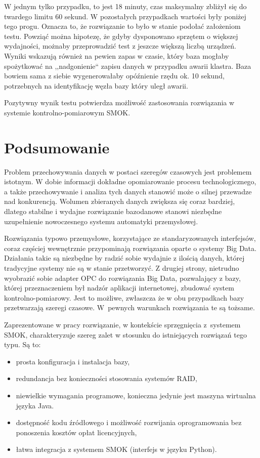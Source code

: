 \documentclass[a4paper,polish,12pt,twoside]{article}
\def \docsection#1{\clearpage\section{#1}}
\begin{document}
W jednym tylko przypadku, to jest 18 minuty, czas maksymalny zbliżył się do twardego limitu 60 sekund. W pozostałych przypadkach wartości były poniżej tego progu. Oznacza to, że rozwiązanie to było w stanie podołać założeniom testu. Powziąć można hipotezę, że gdyby dysponowano sprzętem o większej wydajności, możnaby przeprowadzić test z jeszcze większą liczbą urządzeń. Wyniki wskazują również na pewien zapas w czasie, który baza mogłaby spożytkować na ,,nadgonienie`` zapisu danych w przypadku awarii klastra. Baza bowiem sama z siebie wygenerowałaby opóźnienie rzędu ok. 10 sekund, potrzebnych na identyfikację węzła bazy który uległ awarii. 

Pozytywny wynik testu potwierdza możliwość zastosowania rozwiązania w systemie kontrolno-pomiarowym SMOK.

	\docsection{Podsumowanie}

	Problem przechowywania danych w postaci szeregów czasowych jest problemem istotnym. W dobie informacji dokładne opomiarowanie procesu technologicznego, a także przechowywanie i analiza tych danych stanowić może o silnej przewadze nad konkurencją. Wolumen zbieranych danych zwiększa się coraz bardziej, dlatego stabilne i wydajne rozwiązanie bazodanowe stanowi niezbędne uzupełnienie nowoczesnego systemu automatyki przemysłowej.

	Rozwiązania typowo przemysłowe, korzystające ze standaryzowanych interfejsów, coraz częściej wewnętrznie przypominają rozwiązania oparte o systemy Big Data. Działania takie są niezbędne by radzić sobie wydajnie z ilością danych, której tradycyjne systemy nie są w stanie przetworzyć. Z drugiej strony, nietrudno wyobrazić sobie adapter OPC do rozwiązania Big Data, pozwalający z bazy, której przeznaczeniem był nadzór aplikacji internetowej, zbudować system kontrolno-pomiarowy. Jest to możliwe, zwłaszcza że w obu przypadkach bazy przetwarzają szeregi czasowe. W~pewnych warunkach rozwiązania te są tożsame.

Zaprezentowane w pracy rozwiązanie, w kontekście sprzęgnięcia z~systemem SMOK, charakteryzuje szereg zalet w stosunku do istniejących rozwiązań tego typu. Są to:
\begin{itemize}
	\item prosta konfiguracja i instalacja bazy,
	\item redundancja bez konieczności stosowania systemów RAID,
	\item niewielkie wymagania programowe, konieczna jedynie jest maszyna wirtualna języka Java.
	\item dostępność kodu źródłowego i możliwość rozwijania oprogramowania bez ponoszenia kosztów opłat licencyjnych,
	\item łatwa integracja z systemem SMOK (interfejs w języku Python).
\end{itemize}
\end{document}

